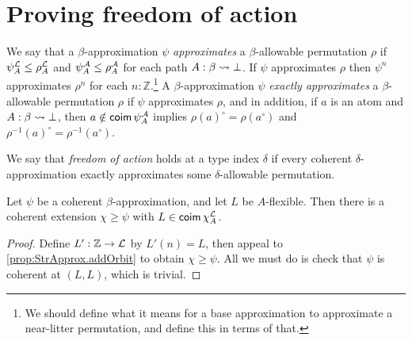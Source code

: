\section{Proving freedom of action}
\begin{definition}[approximates]
  \label{def:StrApprox.Approximates}
  \leanok
  We say that a \( \beta \)-approximation \( \psi \) \emph{approximates} a \( \beta \)-allowable permutation \( \rho \) if \( \psi_A^{\mathcal L} \leq \rho_A^{\mathcal L} \) and \( \psi_A^{\mathcal A} \leq \rho_A^{\mathcal A} \) for each path \( A : \beta \rightsquigarrow \bot \).
  If \( \psi \) approximates \( \rho \) then \( \psi^n \) approximates \( \rho^n \) for each \( n : \mathbb Z \).\footnote{We should define what it means for a base approximation to approximate a near-litter permutation, and define this in terms of that.}
  A \( \beta \)-approximation \( \psi \) \emph{exactly approximates} a \( \beta \)-allowable permutation \( \rho \) if \( \psi \) approximates \( \rho \), and in addition, if \( a \) is an atom and \( A : \beta \rightsquigarrow \bot \), then \( a \notin \operatorname{\mathsf{coim}} \psi_A^{\mathcal A} \) implies \( \rho(a)^\circ = \rho(a^\circ) \) and \( \rho^{-1}(a)^\circ = \rho^{-1}(a^\circ) \).
\end{definition}
\begin{definition}
  \label{def:FreedomOfAction}
  \leanok
  We say that \emph{freedom of action} holds at a type index \( \delta \) if every coherent \( \delta \)-approximation exactly approximates some \( \delta \)-allowable permutation.
\end{definition}
\begin{proposition}
  \label{prop:StrApprox.addFlexible}
  \leanok
  Let \( \psi \) be a coherent \( \beta \)-approximation, and let \( L \) be \( A \)-flexible.
  Then there is a coherent extension \( \chi \geq \psi \) with \( L \in \operatorname{\mathsf{coim}} \chi_A^{\mathcal L} \).
\end{proposition}
\begin{proof}
  \leanok
  Define \( L' : \mathbb Z \to {\mathcal L} \) by \( L'(n) = L \), then appeal to \cref{prop:StrApprox.addOrbit} to obtain \( \chi \geq \psi \).
  All we must do is check that \( \psi \) is coherent at \( (L, L) \), which is trivial.
\end{proof}
